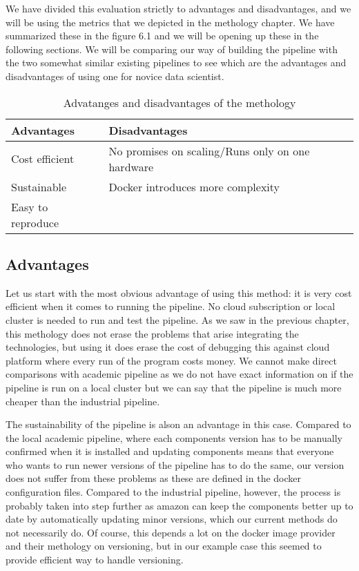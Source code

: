 We have divided this evaluation strictly to advantages and disadvantages, and we will be using the metrics that we depicted in the methology chapter.
We have summarized these in the figure 6.1 and we will be opening up these in the following sections.
We will be comparing our way of building the pipeline with the two somewhat similar existing pipelines to see which are the advantages and disadvantages of using one for novice data scientist.

\begin{table}[! htbp]\centering 
  \caption{Advatanges and disadvantages of the methology}
  \begin{threeparttable}
      \begin{tabular}{|p{6cm}|p{6cm}|}
      \hline
      Advantages & Disadvantages \\ \hline
      Cost efficient & No promises on scaling/Runs only on one hardware \\ 
      Sustainable & Docker introduces more complexity \\ 
      Easy to reproduce & \\ \hline
      \end{tabular}
  \end{threeparttable}
\end{table}

\subsection{Advantages}

Let us start with the most obvious advantage of using this method: it is very cost efficient when it comes to running the pipeline.
No cloud subscription or local cluster is needed to run and test the pipeline.
As we saw in the previous chapter, this methology does not erase the problems that arise integrating the technologies, but using it does erase the cost of debugging this against cloud platform where every run of the program costs money.
We cannot make direct comparisons with academic pipeline as we do not have exact information on if the pipeline is run on a local cluster but we can say that the pipeline is much more cheaper than the industrial pipeline.

The sustainability of the pipeline is alson an advantage in this case.
Compared to the local academic pipeline, where each components version has to be manually confirmed when it is installed and updating components means that everyone who wants to run newer versions of the pipeline has to do the same, our version does not suffer from these problems as these are defined in the docker configuration files.
Compared to the industrial pipeline, however, the process is probably taken into step further as amazon can keep the components better up to date by automatically updating minor versions, which our current methods do not necessarily do.
Of course, this depends a lot on the docker image provider and their methology on versioning, but in our example case this seemed to provide efficient way to handle versioning.

